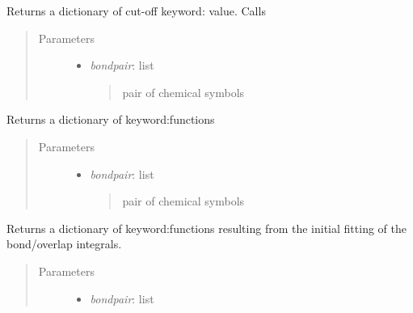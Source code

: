 \documentclass[letterpaper,10pt,english]{sphinxmanual}
\begin{document}
\begin{fulllineitems}
\begin{fulllineitems}
\label{classes:catparam.CATParam.get_cutoffpara}
Returns a dictionary of cut-off keyword: value. Calls {\hyperref[classes:catparam.CATParam.calc_rcut]{}}
\begin{quote}\begin{description}
\item[{Parameters}] \leavevmode\begin{itemize}
\item {} 
\emph{bondpair}: list
\begin{quote}

pair of chemical symbols
\end{quote}

\end{itemize}

\end{description}\end{quote}

\end{fulllineitems}


\begin{fulllineitems}
\label{classes:catparam.CATParam.get_fitfunc}
Returns a dictionary of keyword:functions
\begin{quote}\begin{description}
\item[{Parameters}] \leavevmode\begin{itemize}
\item {} 
\emph{bondpair}: list
\begin{quote}

pair of chemical symbols
\end{quote}

\end{itemize}

\end{description}\end{quote}

\end{fulllineitems}


\begin{fulllineitems}
\label{classes:catparam.CATParam.get_initial_bondparam}
Returns a dictionary of keyword:functions resulting from the initial
fitting of the bond/overlap integrals.
\begin{quote}\begin{description}
\item[{Parameters}] \leavevmode\begin{itemize}
\item {} 
\emph{bondpair}: list
\begin{quote}


\end{quote}
\end{itemize}
\end{description}
\end{quote}
\end{fulllineitems}
\end{fulllineitems}
\end{document}
